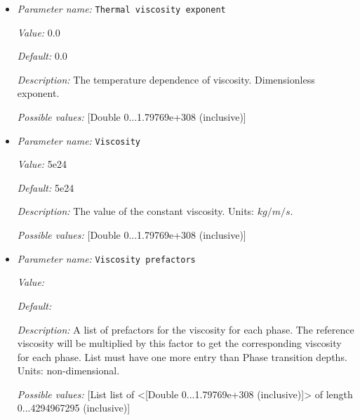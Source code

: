 \begin{itemize}
{\it Value:} 4e-5


{\it Default:} 4e-5


{\it Description:} The value of the thermal expansion coefficient $\beta$. Units: $1/K$.


{\it Possible values:} [Double 0...1.79769e+308 (inclusive)]
\item {\it Parameter name:} {\tt Thermal viscosity exponent}
\label{parameters:Material model/Latent heat/Thermal viscosity exponent}


{\it Value:} 0.0


{\it Default:} 0.0


{\it Description:} The temperature dependence of viscosity. Dimensionless exponent.


{\it Possible values:} [Double 0...1.79769e+308 (inclusive)]
\item {\it Parameter name:} {\tt Viscosity}
\label{parameters:Material model/Latent heat/Viscosity}


{\it Value:} 5e24


{\it Default:} 5e24


{\it Description:} The value of the constant viscosity. Units: $kg/m/s$.


{\it Possible values:} [Double 0...1.79769e+308 (inclusive)]
\item {\it Parameter name:} {\tt Viscosity prefactors}
\label{parameters:Material model/Latent heat/Viscosity prefactors}


{\it Value:} 


{\it Default:} 


{\it Description:} A list of prefactors for the viscosity for each phase. The reference viscosity will be multiplied by this factor to get the corresponding viscosity for each phase. List must have one more entry than Phase transition depths. Units: non-dimensional.


{\it Possible values:} [List list of <[Double 0...1.79769e+308 (inclusive)]> of length 0...4294967295 (inclusive)]
\end{itemize}

